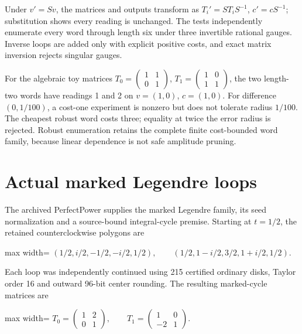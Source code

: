 \documentclass[
  11pt,
  a4paper,
]{report}
\let\singularitytexttt\texttt
\renewcommand{\texttt}[1]{\singularitytexttt{\seqsplit{#1}}}
\begin{document}
Under \(v'=Sv\), the matrices and outputs transform as
\(T_i'=ST_iS^{-1}\), \(c'=cS^{-1}\); substitution shows every reading is
unchanged. The tests independently enumerate every word through length
six under three invertible rational gauges. Inverse loops are added only
with explicit positive costs, and exact matrix inversion rejects
singular gauges.

For the algebraic toy matrices
\(T_0=\left(\begin{smallmatrix}1&1\\0&1\end{smallmatrix}\right)\),
\(T_1=\left(\begin{smallmatrix}1&0\\1&1\end{smallmatrix}\right)\), the
two length-two words have readings 1 and 2 on \(v=(1,0)\), \(c=(1,0)\).
For difference \((0,1/100)\), a cost-one experiment is nonzero but does
not tolerate radius \(1/100\). The cheapest robust word costs three;
equality at twice the error radius is rejected. Robust enumeration
retains the complete finite cost-bounded word family, because linear
dependence is not safe amplitude pruning.

\hypertarget{actual-marked-legendre-loops}{%
\section{Actual marked Legendre
loops}\label{actual-marked-legendre-loops}}

The archived PerfectPower \texttt{period\_matrix\_balls.py} supplies the
marked Legendre family, its seed normalization and a source-bound
integral-cycle premise. Starting at \(t=1/2\), the retained
counterclockwise polygons are

\begin{center}
\begin{adjustbox}{max width=\linewidth}
$\displaystyle
(1/2,i/2,-1/2,-i/2,1/2),\qquad
(1/2,1-i/2,3/2,1+i/2,1/2).
$
\end{adjustbox}
\end{center}

Each loop was independently continued using 215 certified ordinary
disks, Taylor order 16 and outward 96-bit center rounding. The resulting
marked-cycle matrices are

\begin{center}
\begin{adjustbox}{max width=\linewidth}
$\displaystyle
T_0=\begin{pmatrix}1&2\\0&1\end{pmatrix},\qquad
T_1=\begin{pmatrix}1&0\\-2&1\end{pmatrix}.
$
\end{adjustbox}
\end{center}
\end{document}
